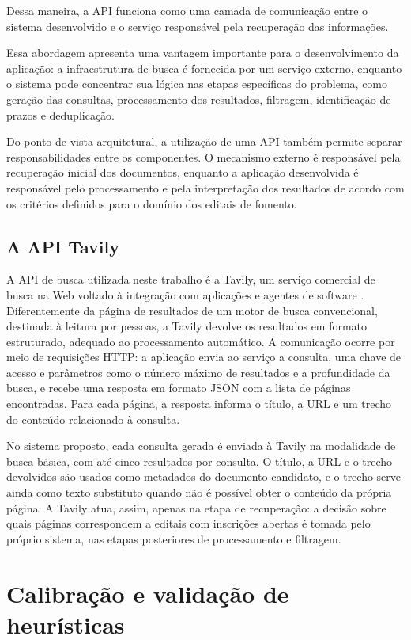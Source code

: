Dessa maneira, a API funciona como uma camada de comunicação entre o sistema desenvolvido e o serviço responsável pela recuperação das informações.

Essa abordagem apresenta uma vantagem importante para o desenvolvimento da aplicação: a infraestrutura de busca é fornecida por um serviço externo, enquanto o sistema pode concentrar sua lógica nas etapas específicas do problema, como geração das consultas, processamento dos resultados, filtragem, identificação de prazos e deduplicação.

Do ponto de vista arquitetural, a utilização de uma API também permite separar responsabilidades entre os componentes. O mecanismo externo é responsável pela recuperação inicial dos documentos, enquanto a aplicação desenvolvida é responsável pelo processamento e pela interpretação dos resultados de acordo com os critérios definidos para o domínio dos editais de fomento.

\subsection{A API Tavily}

A API de busca utilizada neste trabalho é a Tavily, um serviço comercial de busca na Web voltado à integração com aplicações e agentes de software \cite{tavily}. Diferentemente da página de resultados de um motor de busca convencional, destinada à leitura por pessoas, a Tavily devolve os resultados em formato estruturado, adequado ao processamento automático. A comunicação ocorre por meio de requisições HTTP: a aplicação envia ao serviço a consulta, uma chave de acesso e parâmetros como o número máximo de resultados e a profundidade da busca, e recebe uma resposta em formato JSON com a lista de páginas encontradas. Para cada página, a resposta informa o título, a URL e um trecho do conteúdo relacionado à consulta.

No sistema proposto, cada consulta gerada é enviada à Tavily na modalidade de busca básica, com até cinco resultados por consulta. O título, a URL e o trecho devolvidos são usados como metadados do documento candidato, e o trecho serve ainda como texto substituto quando não é possível obter o conteúdo da própria página. A Tavily atua, assim, apenas na etapa de recuperação: a decisão sobre quais páginas correspondem a editais com inscrições abertas é tomada pelo próprio sistema, nas etapas posteriores de processamento e filtragem.

\section{Calibração e validação de heurísticas}
\label{sec:ref_validacao}

